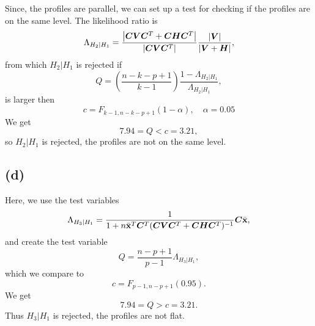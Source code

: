 Since, the profiles are parallel, we can set up a test for checking if
the profiles are on the same level. The likelihood ratio is 
\begin{equation*}
  \Lambda_{H_2 | H_1} = \frac{\left| \bm{C}\bm{V} \bm{C}^{T} + \bm{C} \bm{H}\bm{C}^T \right|}{\left| \bm{C}\bm{V} \bm{C}^T \right|}\frac{\left| \bm{V} \right|}{\left| \bm{V}+\bm{H} \right|},
\end{equation*}
from which $H_{2}|H_{1}$ is rejected if 
\begin{equation*}
  Q = \left(\frac{n-k - p +1}{k - 1}\right)\frac{1 - \Lambda_{H_2 |H_1}}{\Lambda_{H_2 | H_1}},
\end{equation*}
is larger then 
\begin{equation*}
  c = F_{k-1, n - k - p +1} (1 - \alpha), \quad \alpha = 0.05
\end{equation*}
We get
\begin{equation*}
 7.94  = Q < c = 3.21,
\end{equation*}
so $H_2 | H_1$ is rejected, the profiles are not on the same level.

\subsection*{(d)}
\label{sec:d-1}

Here, we use the test variables 
\begin{equation*}
  \Lambda_{H_3 | H_1} = \frac{1}{1 + n \bar{\bf x}^T \bm{C}^T (\bm{CVC}^T +
    \bm{CHC}^T)^{-1}}\bm{C}\bar{\bf x},
\end{equation*}
and create the test variable
\begin{equation*}
  Q = \frac{n - p +1}{p - 1}\Lambda_{H_3 |H_1}, 
\end{equation*}
which we compare to 
\begin{equation*}
  c = F_{p-1, n-p+1}(0.95).
\end{equation*}
We get
\begin{equation*}
  7.94 = Q > c = 3.21.
\end{equation*}
Thus $H_3 | H_1$ is rejected, the profiles are not flat.
